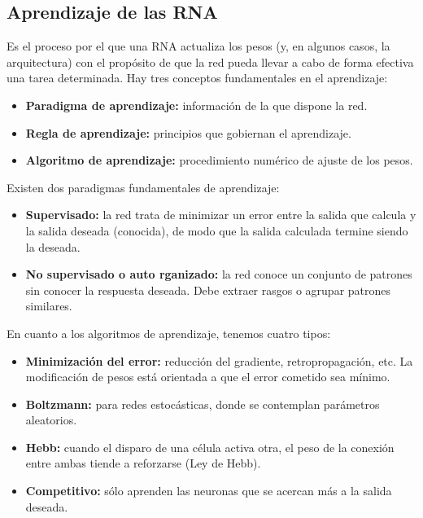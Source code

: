 \documentclass[12pt]{book} %
\begin{document}
	\subsection{Aprendizaje de las RNA}
		 Es el proceso por el que una RNA actualiza los pesos (y, en algunos casos, la arquitectura) con el propósito de que la red pueda llevar a 
		 cabo de forma efectiva una tarea determinada.
		 Hay tres conceptos fundamentales en el aprendizaje:
		 \begin{multicols}{2}
			\begin{itemize}
		 		\item \textbf{Paradigma de aprendizaje:} información de la que dispone la red.
		 	   	\item \textbf{Regla de aprendizaje:} principios que gobiernan el aprendizaje.
		   		 \item \textbf{Algoritmo de aprendizaje:} procedimiento numérico de ajuste de los pesos.
		 	\end{itemize}
		\end{multicols}
		Existen dos paradigmas fundamentales de aprendizaje:
		\begin{multicols}{2}
			\begin{itemize}
		 		\item \textbf{Supervisado:} la red trata de minimizar un error entre la salida que calcula y la salida deseada (conocida), 
		 			de modo que la salida calculada termine siendo la deseada.
		 	   	\item \textbf{No supervisado o auto rganizado:} la red conoce un conjunto de patrones sin conocer la respuesta deseada. 
		 	   		Debe extraer rasgos o agrupar patrones similares.
		 	\end{itemize}
		\end{multicols}
		En cuanto a los algoritmos de aprendizaje, tenemos cuatro tipos:
		\begin{multicols}{2}
			\begin{itemize}
		 		\item \textbf{Minimización del error:} reducción del gradiente, retropropagación, etc. La modificación de pesos está orientada 
		 			a que el error cometido sea mínimo.
		 	   	\item \textbf{Boltzmann: }para redes estocásticas, donde se contemplan parámetros aleatorios.
		 	   	\item \textbf{Hebb:} cuando el disparo de una célula activa otra, el peso de la conexión entre ambas tiende a reforzarse (Ley de Hebb).
		 	   	\item \textbf{Competitivo:} sólo aprenden las neuronas que se acercan más a la salida deseada.
			\end{itemize}
		\end{multicols}
		
\end{document}
